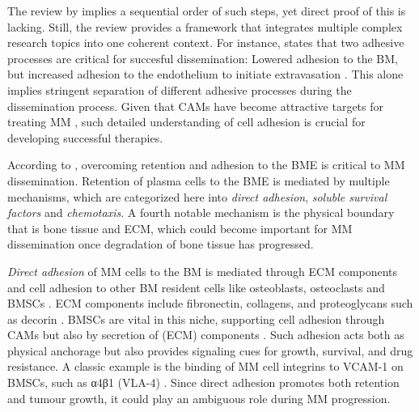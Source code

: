 The review by \citet{zeissigTumourDisseminationMultiple2020} implies a
sequential order of such steps, yet direct proof of this is lacking. Still, the
review provides a framework that integrates multiple complex research topics
into one coherent context. For instance,
\citet{zeissigTumourDisseminationMultiple2020} states that two adhesive
processes are critical for succesful dissemination: Lowered adhesion to the \ac{BM},
but increased adhesion to the endothelium to initiate extravasation
\cite{asosinghUniquePathwayHoming2001a,
    mrozikTherapeuticTargetingNcadherin2015}. This alone implies stringent
separation of different adhesive processes during the dissemination process.
Given that \acp{CAM} have become attractive targets for
treating \ac{MM} \cite{bouzerdanAdhesionMoleculesMultiple2022,
    katzAdhesionMoleculesLifelines2010}, such detailed understanding of cell
adhesion is crucial for developing successful therapies.


%
\label{sec:intro_myeloma_retention}%
According to \citet{zeissigTumourDisseminationMultiple2020}, overcoming
retention and adhesion to the BME is critical to \ac{MM} dissemination. Retention of
plasma cells to the BME is mediated by multiple mechanisms, which are
categorized here into \emph{direct adhesion}, \emph{soluble survival factors}
and \emph{chemotaxis}. A fourth notable mechanism is the physical boundary that
is bone tissue and \ac{ECM}, which could become important for
\ac{MM} dissemination once degradation of bone tissue has progressed.

\emph{Direct adhesion} of \ac{MM} cells to the \ac{BM} is mediated through
\ac{ECM} components and cell adhesion to other \ac{BM} resident cells like
osteoblasts, osteoclasts and \acp{BMSC} \cite{teohINTERACTIONTUMORHOST1997,
    bouzerdanAdhesionMoleculesMultiple2022}. \ac{ECM} components include
fibronectin, collagens, and proteoglycans such as decorin
\cite{huDecorinmediatedSuppressionTumorigenesis2021,
    huangHigherDecorinLevels2015, katzAdhesionMoleculesLifelines2010,
    kiblerAdhesiveInteractionsHuman1998}. \acp{BMSC} are vital in this niche,
supporting cell adhesion through \acp{CAM} but also by secretion of (\ac{ECM})
components \cite{katzAdhesionMoleculesLifelines2010}. Such adhesion acts both as
physical anchorage but also provides signaling cues for growth, survival, and
drug resistance. A classic example is the binding of \ac{MM} cell integrins to
VCAM-1 on \acp{BMSC}, such as α4β1 (VLA-4)
\cite{bouzerdanAdhesionMoleculesMultiple2022}. Since direct adhesion promotes
both retention and tumour growth, it could play an ambiguous role during \ac{MM}
progression.

